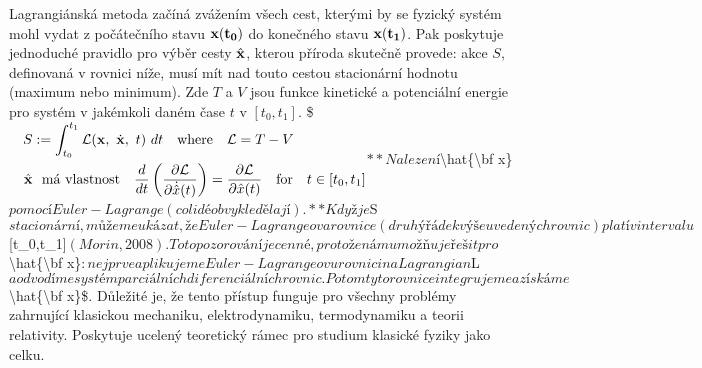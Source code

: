 \documentclass[letterpaper,10pt,english]{jupyterBook}
\begin{document}
\sphinxAtStartPar
{} Lagrangiánská metoda začíná zvážením všech cest, kterými by se fyzický systém mohl vydat z počátečního stavu \(\bf x(t_0)\) do konečného stavu \(\bf x(t_1)\). Pak poskytuje jednoduché pravidlo pro výběr cesty \(\hat{\bf x}\), kterou příroda skutečně provede: akce \(S\), definovaná v rovnici níže, musí mít nad touto cestou stacionární hodnotu (maximum nebo minimum). Zde \(T\) a \(V\) jsou funkce kinetické a potenciální energie pro systém v jakémkoli daném čase \(t\) v \([t_0,t_1]\).
\$\(
\begin{aligned}
S &:= \int_{t_0}^{t_1} \mathcal L({\bf x}, ~ \dot{\bf x}, ~ t) ~ dt
\quad \textrm{where}\quad \mathcal L = T - V \\
\quad \hat{\bf x} &~~ \textrm{má vlastnost} \quad \frac{d}{dt} \left( \frac{\partial \mathcal L}{\partial \dot{\hat{x}}(t)} \right) = \frac{\partial \mathcal L}{\partial \hat{x}(t)} \quad \textrm{for} \quad t \in [t_0,t_1]
\end{aligned}
\)\(
**Nalezení \)\textbackslash{}hat\{\textbackslash{}bf x\}\( pomocí Euler-Lagrange (co lidé obvykle dělají).** Když je \)S\( stacionární, můžeme ukázat, že Euler-Lagrangeova rovnice (druhý řádek výše uvedených rovnic) platí v intervalu \){[}t\_0,t\_1{]}\( (Morin, 2008). Toto pozorování je cenné, protože nám umožňuje řešit pro \)\textbackslash{}hat\{\textbackslash{}bf x\}\(: nejprve aplikujeme Euler-Lagrangeovu rovnici na Lagrangian \)L\( a odvodíme systém parciálních diferenciálních rovnic. Potom tyto rovnice integrujeme a získáme \)\textbackslash{}hat\{\textbackslash{}bf x\}\$. Důležité je, že tento přístup funguje pro všechny problémy zahrnující klasickou mechaniku, elektrodynamiku, termodynamiku a teorii relativity. Poskytuje ucelený teoretický rámec pro studium klasické fyziky jako celku.
\end{document}
